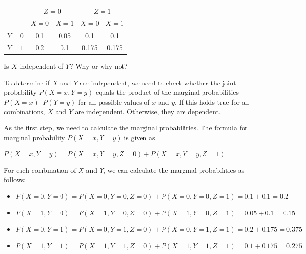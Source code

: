 \documentclass[12pt,letterpaper, onecolumn]{exam}
\begin{document}
\begin{questions}
\begin{parts}
                          \begin{table}[!h]
            \begin{center}
            \begin{tabular}{c | c | c | c | c}
                \hline
                \multirow{2}{4em}{} & \multicolumn{2}{c|}{ \textbf{$Z=0$}  } & \multicolumn{2}{c}{ \textbf{$Z=1$}  }\\ 
                \hline
                \textbf{} & $X=0$ & $X=1$ & $X=0$ & $X=1$ \\ 
                \hline
                $Y=0$ & 0.1 & 0.05 & 0.1 & 0.1 \\ 
                \hline
                $Y=1$ & 0.2 & 0.1 & 0.175 & 0.175 \\ 
                \hline
            \end{tabular}
            \end{center}
            \end{table}

        \begin{subparts}

            \subpart[5]
            Is $X$ independent of $Y$? Why or why not?
    
            \begin{solution}
                To determine if $X$ and $Y$ are independent, we need to check whether the joint probability
                $P(X=x,Y=y)$ equals the product of the marginal probabilities 
                $P(X=x) \cdot P(Y=y)$ for all possible values of $x$ and $y$. If this holds true for all combinations, 
                $X$ and $Y$ are independent. Otherwise, they are dependent.

                As the first step, we need to calculate the marginal probabilities.
                The formula for marginal probability $P(X=x,Y=y)$ is given as

                \begin{center}
                    $\displaystyle{P(X=x,Y=y) = P(X=x,Y=y,Z=0) + P(X=x,Y=y,Z=1)}$
                \end{center}

                For each combination of $X$ and $Y$, we can calculate the marginal probabilities as follows:

                \begin{itemize}
                    \item $P(X=0,Y=0) = P(X=0,Y=0,Z=0) + P(X=0,Y=0,Z=1) = 0.1 + 0.1 = 0.2$
                    \item $P(X=1,Y=0) = P(X=1,Y=0,Z=0) + P(X=1,Y=0,Z=1) = 0.05 + 0.1 = 0.15$
                    \item $P(X=0,Y=1) = P(X=0,Y=1,Z=0) + P(X=0,Y=1,Z=1) = 0.2 + 0.175 = 0.375$
                    \item $P(X=1,Y=1) = P(X=1,Y=1,Z=0) + P(X=1,Y=1,Z=1) = 0.1 + 0.175 = 0.275$
                \end{itemize}


\end{solution}
\end{subparts}
\end{parts}
\end{questions}
\end{document}
